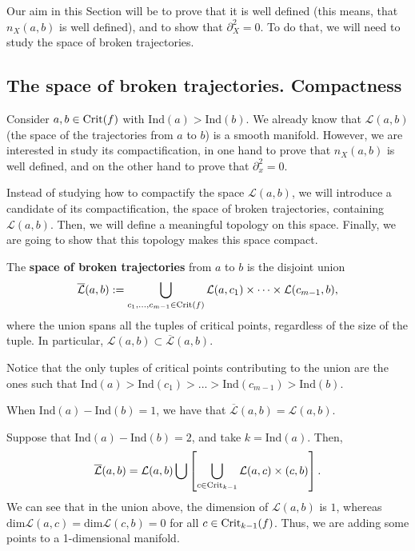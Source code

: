 Our aim in this Section will be to prove that it is well defined (this means, that $n_X(a,b)$ is well defined), and to show that $\partial_X^2 = 0$. To do that, we will need to study the space of broken trajectories.

\subsection{The space of broken trajectories. Compactness}

Consider $a, b \in \text{Crit}(f)$ with $\text{Ind}(a) > \text{Ind}(b)$. We already know that $\mathcal{L}(a,b)$ (the space of the trajectories from $a$ to $b$) is a smooth manifold. However, we are interested in study its compactification, in one hand to prove that $n_X(a,b)$ is well defined, and on the other hand to prove that $\partial_x^2 = 0$.

Instead of studying how to compactify the space $\mathcal{L}(a,b)$, we will introduce a candidate of its compactification, the space of broken trajectories, containing $\mathcal{L}(a,b)$. Then, we will define a meaningful topology on this space. Finally, we are going to show that this topology makes this space compact.

\begin{deff}
The {\bf space of broken trajectories} from $a$ to $b$ is the disjoint union
$$\overline{\mathcal{L}}(a,b) := \bigcup_{c_1,...,c_{m-1} \in \text{Crit}(f)} \mathcal{L}(a,c_1) \times \cdots \times \mathcal{L}(c_{m-1},b) ,$$
where the union spans all the tuples of critical points, regardless of the size of the tuple. In particular, $\mathcal{L}(a,b) \subset \overline{\mathcal{L}}(a,b)$.

Notice that the only tuples of critical points contributing to the union are the ones such that $\text{Ind}(a) > \text{Ind}(c_1) > ... > \text{Ind}(c_{m-1}) > \text{Ind}(b)$.
\end{deff}

\begin{rmrk}
When $\text{Ind}(a) - \text{Ind}(b) = 1$, we have that $\overline{\mathcal{L}}(a,b) = \mathcal{L}(a,b)$.
\end{rmrk}

\begin{rmrk}
Suppose that $\text{Ind}(a) - \text{Ind}(b) = 2$, and take $k = \text{Ind}(a)$. Then,
$$\overline{\mathcal{L}}(a,b) = \mathcal{L}(a,b) \bigcup \left[ \bigcup_{c \in \text{Crit}_{k-1}} \mathcal{L}(a,c) \times \mathcal(c,b) \right] .$$
We can see that in the union above, the dimension of $\mathcal{L}(a,b)$ is $1$, whereas $\text{dim} \mathcal{L}(a,c) = \text{dim} \mathcal{L}(c,b) = 0$ for all $c \in \text{Crit}_{k-1}(f)$. Thus, we are adding some points to a 1-dimensional manifold.
\end{rmrk}

